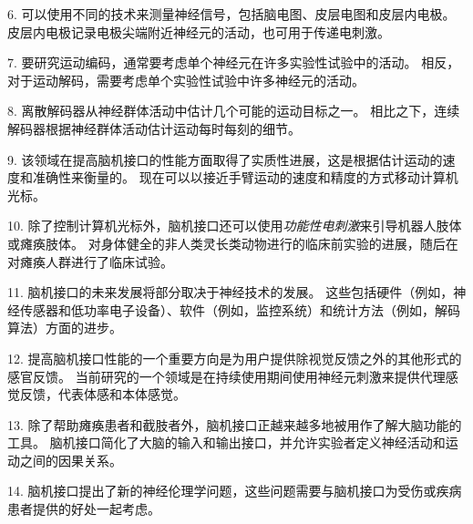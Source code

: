 6. 可以使用不同的技术来测量神经信号，包括脑电图、皮层电图和皮层内电极。
皮层内电极记录电极尖端附近神经元的活动，也可用于传递电刺激。


7. 要研究运动编码，通常要考虑单个神经元在许多实验性试验中的活动。
相反，对于运动解码，需要考虑单个实验性试验中许多神经元的活动。


8. 离散解码器从神经群体活动中估计几个可能的运动目标之一。
相比之下，连续解码器根据神经群体活动估计运动每时每刻的细节。


9. 该领域在提高脑机接口的性能方面取得了实质性进展，这是根据估计运动的速度和准确性来衡量的。
现在可以以接近手臂运动的速度和精度的方式移动计算机光标。


10. 除了控制计算机光标外，脑机接口还可以使用\textit{功能性电刺激}来引导机器人肢体或瘫痪肢体。
对身体健全的非人类灵长类动物进行的临床前实验的进展，随后在对瘫痪人群进行了临床试验。


11. 脑机接口的未来发展将部分取决于神经技术的发展。
这些包括硬件（例如，神经传感器和低功率电子设备）、软件（例如，监控系统）和统计方法（例如，解码算法）方面的进步。


12. 提高脑机接口性能的一个重要方向是为用户提供除视觉反馈之外的其他形式的感官反馈。
当前研究的一个领域是在持续使用期间使用神经元刺激来提供代理感觉反馈，代表体感和本体感觉。


13. 除了帮助瘫痪患者和截肢者外，脑机接口正越来越多地被用作了解大脑功能的工具。
脑机接口简化了大脑的输入和输出接口，并允许实验者定义神经活动和运动之间的因果关系。


14. 脑机接口提出了新的神经伦理学问题，这些问题需要与脑机接口为受伤或疾病患者提供的好处一起考虑。

